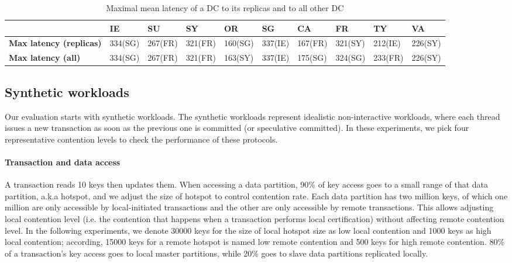 \begin{table}
\small
\begin{center}
  \begin{tabular}{l |  l | l | l| l | l | l| l| l |l } 
     & IE & SU& SY& OR & SG & CA &  FR & TY & VA  \\ \hline
  \textbf{Max latency (replicas)} & 334(SG) & 267(FR) & 321(FR) & 160(SG)  & 337(IE) & 167(FR) & 321(SY)& 212(IE)  &  226(SY)  \\   \hline
  \textbf{Max latency (all)} &  334(SG) &  267(FR) & 321(FR)  & 163(SY) & 337(IE) & 175(SG) & 324(SG)  & 233(FR)  & 226(SY) \\ \hline
  \end{tabular}
\end{center}
\caption{Maximal mean latency of a DC to its replicas and to all other DC}
\label{tab:latency}
\end{table}

\subsection{Synthetic workloads}
Our evaluation starts with synthetic workloads. The synthetic workloads represent idealistic non-interactive workloads, where each thread issues a new transaction as soon as the previous one is committed (or speculative committed). In these experiments, we pick four representative contention levels to check the performance of these protocols.

\paragraph{Transaction and data access} A transaction reads 10 keys then updates them. When accessing a data partition, 90\% of key access goes to a small range of that data partition, a.k.a hotspot, and we adjust the size of hotspot to control contention rate. Each data partition has two million keys, of which one million are only accessible by local-initiated transactions and the other are only accessible by remote transactions. This allows adjusting local contention level (i.e. the contention that happens when a transaction performs local certification) without affecting remote contention level. In the following experiments, we denote 30000 keys for the size of local hotspot size as low local contention and 1000 keys as high local contention; according, 15000 keys for a remote hotspot is named low remote contention and 500 keys for high remote contention. 80\% of a transaction's key access goes to local master partitions, while 20\% goes to slave data partitions replicated locally.

